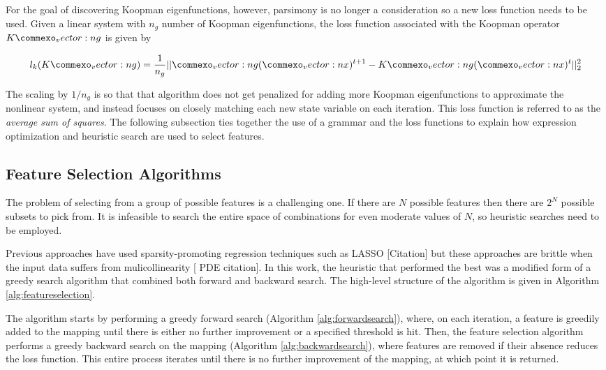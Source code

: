 \documentclass{article}
\renewcommand{\vec}[1]{\vect{#1}}
\begin{document}
For the goal of discovering Koopman eigenfunctions, however, parsimony is no longer a consideration so a new loss function needs to be used. Given a linear system with $n_g$ number of Koopman eigenfunctions, the loss function associated with the Koopman operator $K \vec{g}$ is given by

\[ l_k(K \vec{g}) = \frac{1}{n_g}||\vec{g}(\vec{x})^{t+1} - K \vec{g}(\vec{x})^{t}||_2^2 \]

The scaling by $1/n_g$ is so that that algorithm does not get penalized for adding more Koopman eigenfunctions to approximate the nonlinear system, and instead focuses on closely matching each new state variable on each iteration. This loss function is referred to as the \emph{average sum of squares}. The following subsection ties together the use of a grammar and the loss functions to explain how expression optimization and heuristic search are used to select features.


\subsection{Feature Selection Algorithms}

The problem of selecting from a group of possible features is a challenging one. If there are $N$ possible features then there are $2^N$ possible subsets to pick from. It is infeasible to search the entire space of combinations for even moderate values of $N$, so heuristic searches need to be employed. 

Previous approaches have used sparsity-promoting regression techniques such as LASSO [Citation] but these approaches are brittle when the input data suffers from mulicollinearity [ PDE citation]. In this work, the heuristic that performed the best was a modified form of a greedy search algorithm that combined both forward and backward search. The high-level structure of the algorithm is given in Algorithm \ref{alg:featureselection}.

The algorithm starts by performing a greedy forward search (Algorithm \ref{alg:forwardsearch}), where, on each iteration, a feature is greedily added to the mapping until there is either no further improvement or a specified threshold is hit. Then, the feature selection algorithm performs a greedy backward search on the mapping (Algorithm \ref{alg:backwardsearch}), where features are removed if their absence reduces the loss function. This entire process iterates until there is no further improvement of the mapping, at which point it is returned.
\end{document}
